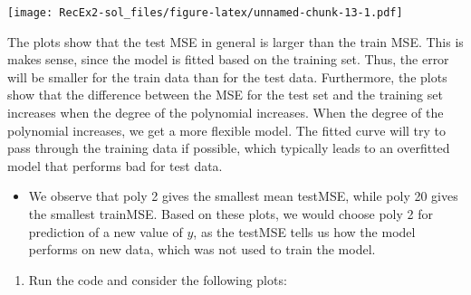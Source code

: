 \documentclass[
]{article}
\providecommand{\tightlist}{%
  \setlength{\itemsep}{0pt}\setlength{\parskip}{0pt}}
\begin{document}
\texttt{[image: RecEx2-sol\_files/figure-latex/unnamed-chunk-13-1.pdf]}

The plots show that the test MSE in general is larger than the train
MSE. This is makes sense, since the model is fitted based on the
training set. Thus, the error will be smaller for the train data than
for the test data. Furthermore, the plots show that the difference
between the MSE for the test set and the training set increases when the
degree of the polynomial increases. When the degree of the polynomial
increases, we get a more flexible model. The fitted curve will try to
pass through the training data if possible, which typically leads to an
overfitted model that performs bad for test data.

\begin{itemize}
\tightlist
\item
  We observe that poly 2 gives the smallest mean testMSE, while poly 20
  gives the smallest trainMSE. Based on these plots, we would choose
  poly 2 for prediction of a new value of \(y\), as the testMSE tells us
  how the model performs on new data, which was not used to train the
  model.
\end{itemize}

\begin{enumerate}
\def\labelenumi{\alph{enumi})}
\setcounter{enumi}{2}
\tightlist
\item
  Run the code and consider the following plots:
\end{enumerate}
\end{document}

